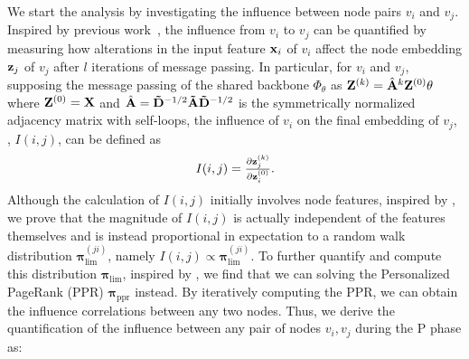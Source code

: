 We start the analysis by investigating the influence between node pairs $v_i$ and $v_j$. 
Inspired by previous work~\citep{xu2018representation,wang2020unifying,zhang2021node}, the influence from $v_i$ to $v_j$ can be quantified by measuring how alterations in the input feature $\mathbf{x}_i$ of $v_i$ affect the node embedding $\mathbf{z}_j$ of $v_j$ after $l$ iterations of message passing. 
In particular, for $v_i$ and $v_j$, supposing the message passing of the shared backbone $\Phi_{\theta}$ as $\mathbf{Z}^{(k)} = \hat{\mathbf{A}}^k \mathbf{Z}^{(0)} \theta $ where $\mathbf{Z}^{(0)} = \mathbf{X}$ and $\hat{\mathbf{A}}= \mathbf{{\tilde{D}}}^{-1/2} \mathbf{{\tilde{A}}} \mathbf{{\tilde{D}}}^{-1/2}$ is the symmetrically normalized adjacency matrix with self-loops, the influence of $v_i$ on the final embedding of $v_j$, \ie, $I(i,j)$, can be defined as
\begin{equation} \label{eq:inf}
    \textstyle I(i,j) =  \frac{\partial \mathbf{z}^{(k)}_{j}}{\partial \mathbf{z}^{(0)}_{i}}.
\end{equation}
Although the calculation of $I(i,j)$ initially involves node features, inspired by \citep{xu2018representation}, we prove that the magnitude of $I(i,j)$ is actually independent of the features themselves and is instead proportional in expectation to a random walk distribution $\mathbf{\pi}_{\text{lim}}^{(ji)}$, namely $I(i, j) \propto \mathbf{\pi}_{\text{lim}}^{(ji)}$. 
To further quantify and compute this distribution $\mathbf{\pi}_{\text{lim}}$, inspired by \citep{gasteiger2018predict}, we find that we can solving the Personalized PageRank (PPR) $\mathbf{\pi}_{\text{ppr}}$ instead. 
By iteratively computing the PPR, we can obtain the influence correlations between any two nodes.
Thus, we derive the quantification of the influence between any pair of nodes $v_i, v_j$ during the P phase as: 

